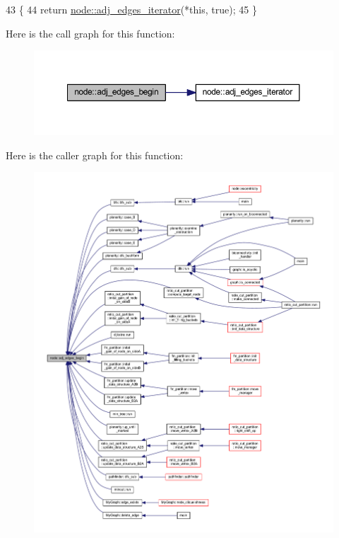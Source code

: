 \begin{DoxyCode}
43 \{
44     \textcolor{keywordflow}{return} \mbox{\hyperlink{classnode_a12cb1a2167f5f03c054de5e707d3156f}{node::adj\_edges\_iterator}}(*\textcolor{keyword}{this}, \textcolor{keyword}{true});
45 \}
\end{DoxyCode}
Here is the call graph for this function\+:\nopagebreak
\begin{figure}[H]
\begin{center}
\leavevmode
\includegraphics[width=350pt]{classnode_a788d3e932a5c164caa5ec82aa47551b2_cgraph}
\end{center}
\end{figure}
Here is the caller graph for this function\+:\nopagebreak
\begin{figure}[H]
\begin{center}
\leavevmode
\includegraphics[width=350pt]{classnode_a788d3e932a5c164caa5ec82aa47551b2_icgraph}
\end{center}
\end{figure}
\mbox{\label{classnode_aa1e7887d29390297580769454f769ad6}} 
